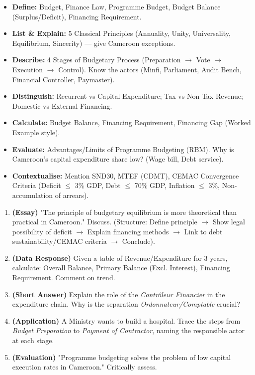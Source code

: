 \documentclass[11pt]{article}
\newcounter{popsec}
\newcounter{popsub}
\newcommand{\courssub}[1]{%
  \stepcounter{popsub}%
  \par\vspace{9pt}\noindent{\popxbold\fontsize{11.5}{13}\selectfont\color{popink}{\color{poporange}\thepopsec.\thepopsub}\hspace{6pt}#1}\par\nopagebreak\vspace{4pt}
}
\begin{document}
\courssub{Synthesis and Exam Focus}

\begin{aretenir}
\begin{itemize}
\item \textbf{Define:} Budget, Finance Law, Programme Budget, Budget Balance (Surplus/Deficit), Financing Requirement.
\item \textbf{List \& Explain:} 5 Classical Principles (Annuality, Unity, Universality, Equilibrium, Sincerity) — give Cameroon exceptions.
\item \textbf{Describe:} 4 Stages of Budgetary Process (Preparation $\to$ Vote $\to$ Execution $\to$ Control). Know the actors (Minfi, Parliament, Audit Bench, Financial Controller, Paymaster).
\item \textbf{Distinguish:} Recurrent vs Capital Expenditure; Tax vs Non-Tax Revenue; Domestic vs External Financing.
\item \textbf{Calculate:} Budget Balance, Financing Requirement, Financing Gap (Worked Example style).
\item \textbf{Evaluate:} Advantages/Limits of Programme Budgeting (RBM). Why is Cameroon's capital expenditure share low? (Wage bill, Debt service).
\item \textbf{Contextualise:} Mention SND30, MTEF (CDMT), CEMAC Convergence Criteria (Deficit $\le$ 3\% GDP, Debt $\le$ 70\% GDP, Inflation $\le$ 3\%, Non-accumulation of arrears).
\end{itemize}
\end{aretenir}

\begin{exercice}
\begin{enumerate}
    \item \textbf{(Essay)} "The principle of budgetary equilibrium is more theoretical than practical in Cameroon." Discuss. (Structure: Define principle $\to$ Show legal possibility of deficit $\to$ Explain financing methods $\to$ Link to debt sustainability/CEMAC criteria $\to$ Conclude).
    \item \textbf{(Data Response)} Given a table of Revenue/Expenditure for 3 years, calculate: Overall Balance, Primary Balance (Excl. Interest), Financing Requirement. Comment on trend.
    \item \textbf{(Short Answer)} Explain the role of the \emph{Contrôleur Financier} in the expenditure chain. Why is the separation \emph{Ordonnateur/Comptable} crucial?
    \item \textbf{(Application)} A Ministry wants to build a hospital. Trace the steps from \emph{Budget Preparation} to \emph{Payment of Contractor}, naming the responsible actor at each stage.
    \item \textbf{(Evaluation)} "Programme budgeting solves the problem of low capital execution rates in Cameroon." Critically assess.
\end{enumerate}
\end{exercice}
\end{document}
